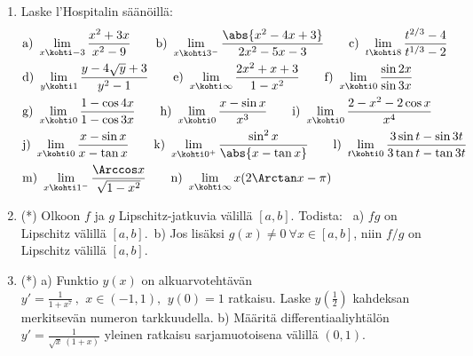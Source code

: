 \begin{enumerate}
\item
Laske l'Hospitalin säänöillä:
\begin{align*}
&\text{a)}\ \lim_{x \kohti -3} \frac{x^2+3x}{x^2-9} \qquad
 \text{b)}\ \lim_{x \kohti 3^-} \frac{\abs{x^2-4x+3}}{2x^2-5x-3} \qquad
 \text{c)}\ \lim_{t \kohti 8} \frac{t^{2/3}-4}{t^{1/3}-2} \\
&\text{d)}\ \lim_{y \kohti 1} \frac{y-4\sqrt{y}+3}{y^2-1} \qquad
 \text{e)}\ \lim_{x\kohti\infty} \frac{2x^2+x+3}{1-x^2} \qquad
 \text{f)}\ \lim_{x \kohti 0} \frac{\sin 2x}{\sin 3x} \\
&\text{g)}\ \lim_{x \kohti 0} \frac{1-\cos 4x}{1-\cos 3x} \qquad
 \text{h)}\ \lim_{x \kohti 0} \frac{x-\sin x}{x^3} \qquad
 \text{i)}\ \lim_{x \kohti 0} \frac{2-x^2-2\cos x}{x^4} \\
&\text{j)}\ \lim_{x \kohti 0} \frac{x-\sin x}{x-\tan x} \qquad
 \text{k)}\ \lim_{x \kohti 0^+} \frac{\sin^2 x}{\abs{x-\tan x}} \qquad
 \text{l)}\ \lim_{t \kohti 0} \frac{3\sin t-\sin 3t}{3\tan t-\tan 3t} \\
&\text{m)}\ \lim_{x \kohti 1^-} \frac{\Arccos x}{\sqrt{1-x^2}} \qquad
 \text{n)}\ \lim_{x \kohti \infty} x(2\Arctan x-\pi)
\end{align*}

\item (*)
Olkoon $f$ ja $g$ Lipschitz-jatkuvia välillä $[a,b]$. Todista: \ a) $fg$ on Lipschitz
välillä $[a,b]$.\, b) Jos lisäksi $g(x) \neq 0\ \forall x\in[a,b]$, niin $f/g$ on Lipschitz
välillä $[a,b]$.

\item (*)
a) Funktio $y(x)$ on alkuarvotehtävän
$y'=\frac{1}{1+x^7}\,,\,\ x\in(-1,1),\,\ y(0)=1$
ratkaisu. Laske $y(\tfrac{1}{2})$ kahdeksan merkitsevän numeron tarkkuudella.
\vspace{1mm}\newline
b) Määritä differentiaaliyhtälön $y'=\frac{1}{\sqrt{x}\,(1+x)}$
yleinen ratkaisu sarjamuotoisena välillä $(0,1)$.


\end{enumerate}
